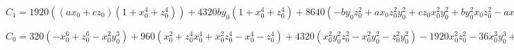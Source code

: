 $C_1  = 1920((ax_0 + cz_0)(1 + x_0^4 + z_0^4)) + 4320by_0(1 + x_0^4 + z_0^4) + 8640(-­by_0z_0^2 + 
ax_0z_0^2y_0^2 + cz_0x_0^2y_0^2 + by_0^2x_0z_0^2 -­ ax_0y_0^2 + ay_0^2 + ax_0^3y_0^2 -­ cz_0y_0^2 + cz_0^3y_0^2 - by_0x_0^2) -­ 
3840(cz_0^3 + ax_0^3 + ax_0z_0^2 - ­ax_0^2z_0^2 + cz_0x_0^2 -­ cz_0^3x_0^2) -­ 19440(by_0^3(1 -­ x_0^2 -­ z_0^2)) + 
9720(y_0^4(ax_0 + cz_0)) + 21870(by_0^4)­ - 640(ax_0y_0^3 - by_0^2x_0^2) -­ 108(cz_0^2y_0^2 + by_0^2y_0^3)$
 
$C_0 = 320(-­x_0^6 + z_0^6 - x_0^2y_0^3) + 960(x_0^2 + z_0^4x_0^4 + x_0^2z_0^4 -­ x_0^4 -­ z_0^4) + 4320(x_0^2y_0^2z_0^2 -­ 
x_0^2y_0^2 -­ z_0^2y_0^2) ­- 1920x_0^2z_0^2 - ­36x_0^3y_0^3 + 2160(y_0^2(1 + x_0^4 + z_0^4)) + 4860(y_0^4(x_0^2 + z_0^2  
+ 1)) + 3645y_0^5$
